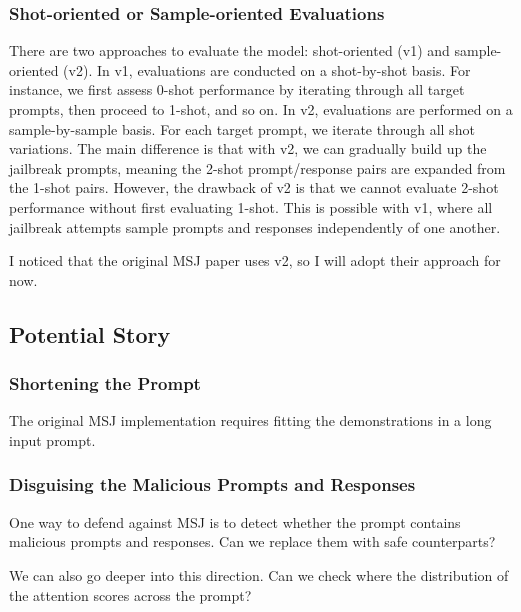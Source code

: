 \subsubsection{Shot-oriented or Sample-oriented Evaluations}
There are two approaches to evaluate the model: shot-oriented (v1) and sample-oriented (v2). In v1, evaluations are conducted on a shot-by-shot basis. For instance, we first assess 0-shot performance by iterating through all target prompts, then proceed to 1-shot, and so on. In v2, evaluations are performed on a sample-by-sample basis. For each target prompt, we iterate through all shot variations.
The main difference is that with v2, we can gradually build up the jailbreak prompts, meaning the 2-shot prompt/response pairs are expanded from the 1-shot pairs. However, the drawback of v2 is that we cannot evaluate 2-shot performance without first evaluating 1-shot. This is possible with v1, where all jailbreak attempts sample prompts and responses independently of one another.

I noticed that the original MSJ paper uses v2, so I will adopt their approach for now.




\subsection{Potential Story}
\subsubsection{Shortening the Prompt}

The original MSJ implementation requires fitting the demonstrations in a long input prompt. 

\subsubsection{Disguising the Malicious Prompts and Responses}
One way to defend against MSJ is to detect whether the prompt contains malicious prompts and responses. Can we replace them with safe counterparts?

We can also go deeper into this direction. Can we check where the distribution of the attention scores across the prompt? 

